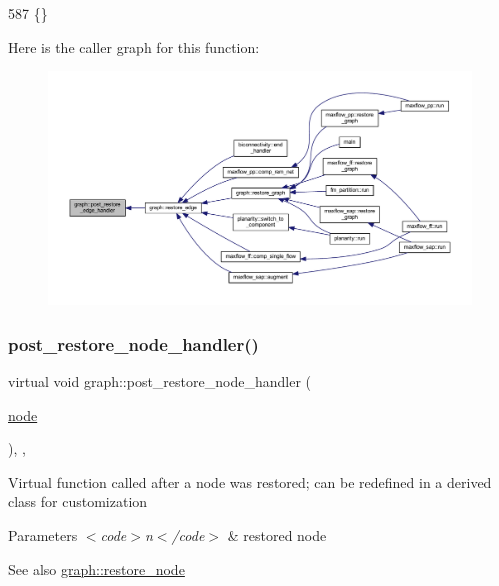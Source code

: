 \begin{DoxyCode}
587 \{\}
\end{DoxyCode}
Here is the caller graph for this function\+:
\nopagebreak
\begin{figure}[H]
\begin{center}
\leavevmode
\includegraphics[width=350pt]{classgraph_adfc71011ae82f047c550eba6d9e7bb3a_icgraph}
\end{center}
\end{figure}
\mbox{\label{classgraph_a2d555506de6aa30bb981f0b60375762d}} 
\subsubsection{\texorpdfstring{post\+\_\+restore\+\_\+node\+\_\+handler()}{post\_restore\_node\_handler()}}
{\footnotesize\ttfamily virtual void graph\+::post\+\_\+restore\+\_\+node\+\_\+handler (\begin{DoxyParamCaption}\item[{\mbox{\hyperlink{classnode}{node}}}]{ }\end{DoxyParamCaption})\hspace{0.3cm}{\ttfamily [inline]}, {\ttfamily [virtual]}, {\ttfamily [inherited]}}

Virtual function called after a node was restored; can be redefined in a derived class for customization


\begin{DoxyParams}{Parameters}
{\em $<$code$>$n$<$/code$>$} & restored node \\
\hline
\end{DoxyParams}
\begin{DoxySeeAlso}{See also}
\mbox{\hyperlink{classgraph_ab57aab79e649cc275052b7decbdd03ec}{graph\+::restore\+\_\+node}} 
\end{DoxySeeAlso}



